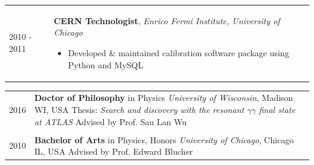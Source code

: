 \documentclass{letter}
\begin{document}
\begin{tabular}{p{}p{}}
  2010 - 2011
  &
  \textbf{CERN Technologist}, \textit{Enrico Fermi Institute, University of Chicago} \newline
  \vspace{-15pt}  %
  \begin{itemize}
    \itemsep0em
    \renewcommand{\labelitemi}{\tiny$\blacksquare$} 
    \item Developed \& maintained calibration software package using Python and MySQL
  \end{itemize}
\end{tabular}
\vspace{-10pt}



\begin{flushleft}
  \Large{\textsc{\textbf{\color{Maroon}{Education}}}}
  \vspace{1pt}  %
\end{flushleft}

  \begin{tabular}{p{}p{}}
  2016
  &
  \textbf{Doctor of Philosophy} in Physics \newline 
  \textit{University of Wisconsin}, Madison WI, USA \newline
  Thesis: \textit{Search and discovery with the resonant $\gamma\gamma$ final state at ATLAS} \newline
  Advised by Prof. Sau Lan Wu \\
  \\

  2010 
  & 
  \textbf{Bachelor of Arts} in Physics, Honors \newline 
  \textit{University of Chicago}, Chicago IL, USA \newline
  Advised by Prof. Edward Blucher 
\end{tabular}
\end{document}

